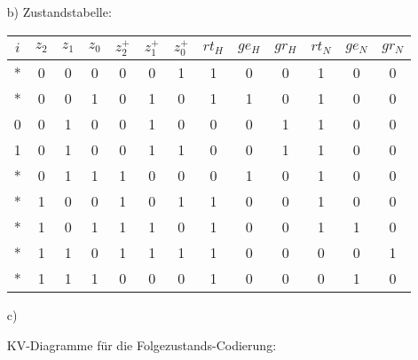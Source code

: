 \documentclass[a4paper,10pt]{scrartcl}
\begin{document}
\begin{enumerate}
\begin{enumerate}
            \item[b)]
            Zustandstabelle:

            \begin{tabular}[t]{|c|ccc||ccc|ccc|ccc|}
                \hline
                $i$ & $z_2$ & $z_1$ & $z_0$ & $z_2^+$ & $z_1^+$ & $z_0^+$ & $rt_H$ & $ge_H$ & $gr_H$ & $rt_N$ & $ge_N$ & $gr_N$\\
                \hline
                * &     0 & 0 & 0 &     0 & 0 & 1 &     1 & 0 & 0 &     1 & 0 & 0 \\
                * &     0 & 0 & 1 &     0 & 1 & 0 &     1 & 1 & 0 &     1 & 0 & 0 \\
                0 &     0 & 1 & 0 &     0 & 1 & 0 &     0 & 0 & 1 &     1 & 0 & 0 \\
                1 &     0 & 1 & 0 &     0 & 1 & 1 &     0 & 0 & 1 &     1 & 0 & 0 \\
                * &     0 & 1 & 1 &     1 & 0 & 0 &     0 & 1 & 0 &     1 & 0 & 0 \\
                * &     1 & 0 & 0 &     1 & 0 & 1 &     1 & 0 & 0 &     1 & 0 & 0 \\
                * &     1 & 0 & 1 &     1 & 1 & 0 &     1 & 0 & 0 &     1 & 1 & 0 \\
                * &     1 & 1 & 0 &     1 & 1 & 1 &     1 & 0 & 0 &     0 & 0 & 1 \\
                * &     1 & 1 & 1 &     0 & 0 & 0 &     1 & 0 & 0 &     0 & 1 & 0 \\
                \hline
            \end{tabular}
            \vspace{1em}

            \item[c)]

                KV-Diagramme für die Folgezustands-Codierung:

                \begin{minipage}[t]{0.3\textwidth}
                    \centering
\end{minipage}
\end{enumerate}
\end{enumerate}
\end{document}
